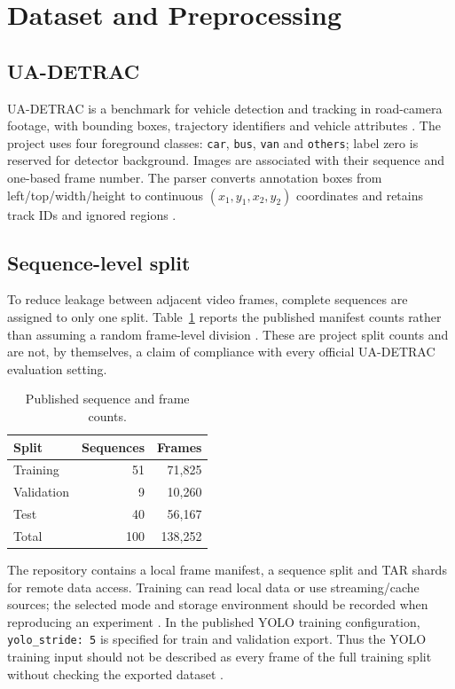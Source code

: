 \section{Dataset and Preprocessing}
\label{sec:dataset}
\subsection{UA-DETRAC}
UA-DETRAC is a benchmark for vehicle detection and tracking in road-camera footage, with bounding boxes, trajectory identifiers and vehicle attributes \cite{detrac}. The project uses four foreground classes: \texttt{car}, \texttt{bus}, \texttt{van} and \texttt{others}; label zero is reserved for detector background. Images are associated with their sequence and one-based frame number. The parser converts annotation boxes from left/top/width/height to continuous $(x_1,y_1,x_2,y_2)$ coordinates and retains track IDs and ignored regions \cite{architecture}.

\subsection{Sequence-level split}
To reduce leakage between adjacent video frames, complete sequences are assigned to only one split. Table~\ref{tab:splits} reports the published manifest counts rather than assuming a random frame-level division \cite{manifest}. These are project split counts and are not, by themselves, a claim of compliance with every official UA-DETRAC evaluation setting.
\begin{table}[htbp]
\centering
\caption{Published sequence and frame counts.}
\label{tab:splits}
\begin{tabular}{lrr}
\toprule
Split & Sequences & Frames \\
\midrule
Training & 51 & 71,825 \\
Validation & 9 & 10,260 \\
Test & 40 & 56,167 \\
\midrule
Total & 100 & 138,252 \\
\bottomrule
\end{tabular}
\end{table}

The repository contains a local frame manifest, a sequence split and TAR shards for remote data access. Training can read local data or use streaming/cache sources; the selected mode and storage environment should be recorded when reproducing an experiment \cite{repository}. In the published YOLO training configuration, \texttt{yolo\_stride: 5} is specified for train and validation export. Thus the YOLO training input should not be described as every frame of the full training split without checking the exported dataset \cite{yoloconfig}.


